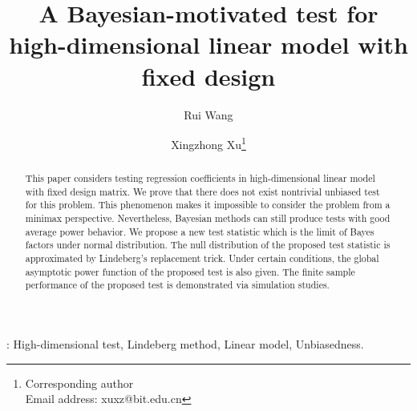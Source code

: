 \documentclass[11pt]{article}
\theoremstyle{plain}
\theoremstyle{definition}
\theoremstyle{remark}
\begin{document}
\title{
A Bayesian-motivated test for high-dimensional linear model with fixed design
}



\author[1]{Rui Wang}
\author[1,2]{Xingzhong Xu\thanks{Corresponding author\\Email address: xuxz@bit.edu.cn}}

\maketitle
\begin{abstract}
    This paper considers testing regression coefficients in high-dimensional linear model with fixed design matrix.
    We prove that there does not exist nontrivial unbiased test for this problem.
    This phenomenon makes it impossible to consider the problem from a minimax perspective.
    Nevertheless, Bayesian methods can still produce tests with good average power behavior.
    We propose a new test statistic which is the limit of Bayes factors under normal distribution.
    The null distribution of the proposed test statistic is approximated by Lindeberg's replacement trick.
    Under certain conditions, the global asymptotic power function of the proposed test is also given.
    The finite sample performance of the proposed test is demonstrated via simulation studies.

\end{abstract}

: High-dimensional test, Lindeberg method, Linear model, Unbiasedness.
\end{document}

